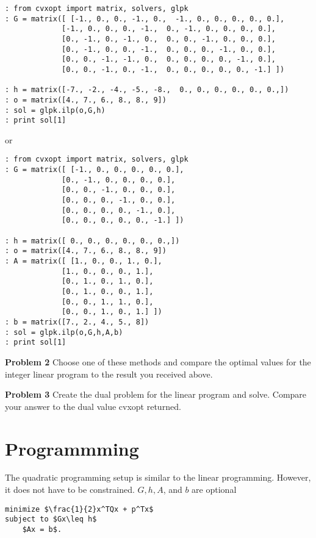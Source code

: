 \begin{lstlisting}
: from cvxopt import matrix, solvers, glpk
: G = matrix([ [-1., 0., 0., -1., 0.,  -1., 0., 0., 0., 0., 0.],
             [-1., 0., 0., 0., -1.,  0., -1., 0., 0., 0., 0.],
             [0., -1., 0., -1., 0.,  0., 0., -1., 0., 0., 0.],
             [0., -1., 0., 0., -1.,  0., 0., 0., -1., 0., 0.],
             [0., 0., -1., -1., 0.,  0., 0., 0., 0., -1., 0.],
             [0., 0., -1., 0., -1.,  0., 0., 0., 0., 0., -1.] ])

: h = matrix([-7., -2., -4., -5., -8.,  0., 0., 0., 0., 0., 0.,])
: o = matrix([4., 7., 6., 8., 8., 9])
: sol = glpk.ilp(o,G,h)
: print sol[1]
\end{lstlisting} 

or 
\begin{lstlisting}
: from cvxopt import matrix, solvers, glpk
: G = matrix([ [-1., 0., 0., 0., 0., 0.],
             [0., -1., 0., 0., 0., 0.],
             [0., 0., -1., 0., 0., 0.],
             [0., 0., 0., -1., 0., 0.],
             [0., 0., 0., 0., -1., 0.],
             [0., 0., 0., 0., 0., -1.] ])

: h = matrix([ 0., 0., 0., 0., 0., 0.,])
: o = matrix([4., 7., 6., 8., 8., 9])
: A = matrix([ [1., 0., 0., 1., 0.],
             [1., 0., 0., 0., 1.],
             [0., 1., 0., 1., 0.],
             [0., 1., 0., 0., 1.],
             [0., 0., 1., 1., 0.],
             [0., 0., 1., 0., 1.] ])
: b = matrix([7., 2., 4., 5., 8])
: sol = glpk.ilp(o,G,h,A,b)
: print sol[1]
\end{lstlisting} 

\textbf{Problem 2}
Choose one of these methods and compare the optimal values for the integer linear program to the result you received above. 

\textbf{Problem 3}
Create the dual problem for the linear program and solve. 
Compare your answer to the dual value cvxopt returned. 

\section*{Programmming}

The quadratic programming setup is similar to the linear programming.
However, it does not have to be constrained.
$G, h, A$, and $b$ are optional

\begin{lstlisting}[mathescape]
minimize $\frac{1}{2}x^TQx + p^Tx$
subject to $Gx\leq h$
	$Ax = b$.
\end{lstlisting}


